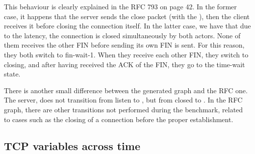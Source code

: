 \documentclass[a4paper,10pt]{article}
\begin{document}
This behaviour is clearly explained in the RFC 793\cite{RFC793} on page 42. In the former case, it happens that the server sends the close packet (with the ), then the client receives it before closing the connection itself.
In the latter case, we have that due to the latency, the connection is closed simultaneously by both actors. None of them receives the other FIN before sending its own FIN is sent. For this reason, they both switch to fin-wait-1. When they receive each other FIN, they switch to closing, and after having received the ACK of the FIN, they go to the time-wait state.

There is another small difference between the generated graph and the RFC one. The server, does not transition from listen to , but from closed to . In the RFC graph, there are other transitions not performed during the benchmark, related to cases such as the closing of a connection before the proper establishment.



\subsection{TCP variables across time}
\label{sec:tcp_variables}
\end{document}
